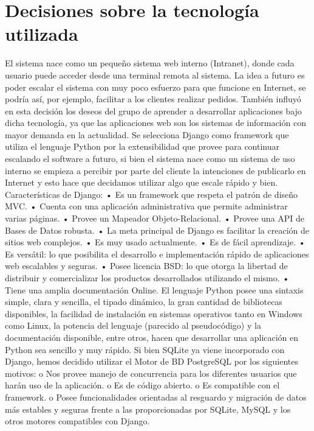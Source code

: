 \documentclass[letterpaper,10pt,english]{sphinxmanual}
\begin{document}
\section{Decisiones sobre la tecnología utilizada}
\label{proyecto:decisiones-sobre-la-tecnologia-utilizada}
El sistema nace como un pequeño sistema web interno (Intranet), donde cada usuario puede acceder desde una terminal remota al sistema. La idea a futuro es poder escalar el sistema con muy poco esfuerzo para que funcione en Internet, se podría así, por ejemplo, facilitar a los clientes realizar pedidos.
También influyó en esta decisión los deseos del grupo de aprender a desarrollar aplicaciones bajo dicha tecnología, ya que las aplicaciones web son los sistemas de información con mayor demanda en la actualidad.
Se selecciona Django como framework que utiliza el lenguaje Python por la extensibilidad que provee para continuar escalando el software a futuro, si bien el sistema nace como un sistema de uso interno se empieza a percibir por parte del cliente la intenciones de publicarlo en Internet y esto hace que decidamos utilizar algo que escale rápido y bien. Características de Django:
•       Es un framework que respeta el patrón de diseño MVC.
•       Cuenta con una aplicación administrativa que permite administrar varias páginas.
•       Provee un Mapeador Objeto-Relacional.
•       Provee una API de Bases de Datos robusta.
•       La meta principal de Django es facilitar la creación de sitios web complejos.
•       Es muy usado actualmente.
•       Es de fácil aprendizaje.
•       Es versátil: lo que posibilita el desarrollo e implementación rápido de aplicaciones web escalables y seguras.
•       Posee licencia BSD: lo que otorga la libertad de distribuir y comercializar los productos desarrollados utilizando el mismo.
•       Tiene una amplia documentación Online.
El lenguaje Python posee una sintaxis simple, clara y sencilla, el tipado dinámico, la gran cantidad de bibliotecas disponibles, la facilidad de instalación en sistemas operativos tanto en Windows como Linux, la potencia del lenguaje (parecido al pseudocódigo) y la documentación disponible, entre otros, hacen que desarrollar una aplicación en Python sea sencillo y muy rápido.
Si bien SQLite ya viene incorporado con Django, hemos decidido utilizar el Motor de BD PostgreSQL por los siguientes motivos:
o       Nos provee manejo de concurrencia para los diferentes usuarios que harán uso de la aplicación.
o       Es de código abierto.
o       Es compatible con el framework.
o       Posee funcionalidades orientadas al resguardo y migración de datos más estables y seguras frente a las proporcionadas por SQLite, MySQL y los otros motores compatibles con Django.
\end{document}
